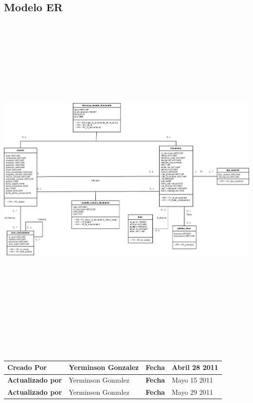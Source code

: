 \subsection{Modelo ER} 
	\begin{minipage}[c]{1\linewidth}
	    \centering
        \includegraphics[width=19cm, height=17cm, angle=90]{modeloDatos}
    \end{minipage}\\[.1cm]
       	
    \begin{tabular}{|p{3.5cm}|p{4.5cm}|p{2.5cm}|p{4.5cm}|}\hline
	{\bf Creado Por} & {Yerminson Gonzalez} & {\bf Fecha} & {Abril 28 2011}\\
	\hline
	{\bf Actualizado por} & {Yerminson Gonzalez} & {\bf Fecha} & {Mayo 15 2011}\\
	\hline
	{\bf Actualizado por} & {Yerminson Gonzalez} & {\bf Fecha} & {Mayo 29 2011}\\
	\hline
	\end{tabular}
        	
